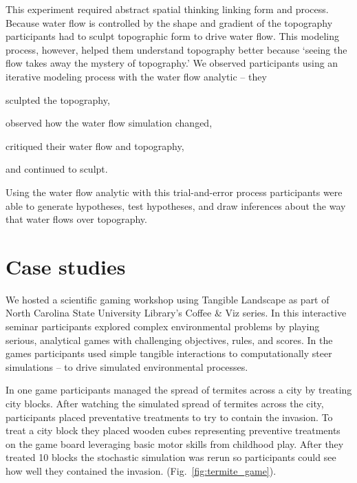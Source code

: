 \documentclass[prodmode,acmtochi]{acmsmall} %
\begin{document}
This experiment required abstract spatial thinking linking form and process. 
Because water flow is controlled by the shape and gradient of the topography
participants had to sculpt topographic form to drive water flow. 
This modeling process, however, helped them understand topography better 
because `seeing the flow takes away the mystery of topography.' 
%
We observed participants using an iterative modeling process 
with the water flow analytic -- 
they 
\begin{enumerate*}[label=\alph*),font=\itshape]
\item sculpted the topography, 
\item observed how the water flow simulation changed, 
\item critiqued their water flow and topography, 
\item and continued to sculpt.
\end{enumerate*}
%
Using the water flow analytic with this trial-and-error process
participants were able to generate hypotheses, test hypotheses, and draw inferences 
about the way that water flows over topography. 
%


\section{Case studies}
%
%
We hosted a scientific gaming workshop using Tangible Landscape 
as part of North Carolina State University Library's Coffee \& Viz series. 
In this interactive seminar participants 
explored complex environmental problems 
by playing serious, analytical games
with challenging objectives, rules, and scores. 
In the games
participants used simple tangible interactions 
to computationally steer simulations -- 
to drive simulated environmental processes. 

In one game participants managed 
the spread of termites across a city by treating city blocks. 
After watching the simulated spread of termites across the city, 
participants placed preventative treatments to try to contain the invasion. 
To treat a city block they placed wooden cubes 
representing preventive treatments on the game board 
leveraging basic motor skills from childhood play.
After they treated 10 blocks
the stochastic simulation was rerun
so participants could see how well they contained the invasion. 
(Fig.~\ref{fig:termite_game}).
\end{document}
